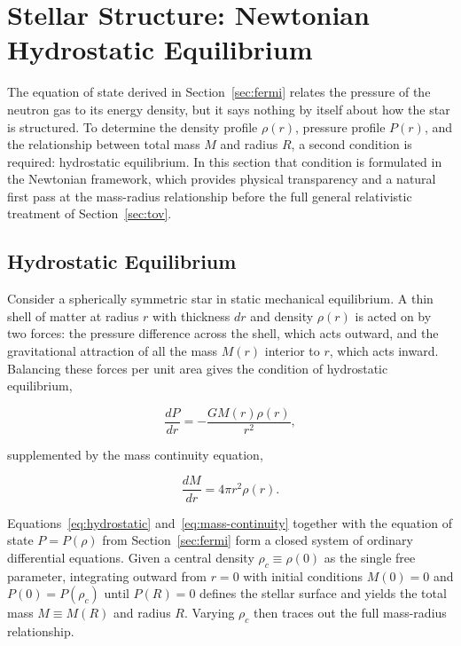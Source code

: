\section{Stellar Structure: Newtonian Hydrostatic Equilibrium}
\label{sec:newtonian}

The equation of state derived in Section~\ref{sec:fermi} relates the
pressure of the neutron gas to its energy density, but it says nothing
by itself about how the star is structured. To determine the density
profile $\rho(r)$, pressure profile $P(r)$, and the relationship between
total mass $M$ and radius $R$, a second condition is required: hydrostatic equilibrium. In this section that condition is formulated in the Newtonian framework, which provides physical transparency and a natural first pass at the mass-radius relationship before the full general relativistic treatment of Section~\ref{sec:tov}.

\subsection{Hydrostatic Equilibrium}

Consider a spherically symmetric star in static mechanical equilibrium.
A thin shell of matter at radius $r$ with thickness $dr$ and density
$\rho(r)$ is acted on by two forces: the pressure difference across the
shell, which acts outward, and the gravitational attraction of all the
mass $M(r)$ interior to $r$, which acts inward. Balancing these forces
per unit area gives the condition of hydrostatic equilibrium,

\begin{equation}
    \frac{dP}{dr} = -\frac{G M(r) \rho(r)}{r^2},
    \label{eq:hydrostatic}
\end{equation}

supplemented by the mass continuity equation,

\begin{equation}
    \frac{dM}{dr} = 4\pi r^2 \rho(r).
    \label{eq:mass-continuity}
\end{equation}

Equations~\eqref{eq:hydrostatic} and~\eqref{eq:mass-continuity} together
with the equation of state $P = P(\rho)$ from Section~\ref{sec:fermi}
form a closed system of ordinary differential equations. Given a central
density $\rho_c \equiv \rho(0)$ as the single free parameter, integrating
outward from $r = 0$ with initial conditions $M(0) = 0$ and $P(0) =
P(\rho_c)$ until $P(R) = 0$ defines the stellar surface and yields the
total mass $M \equiv M(R)$ and radius $R$. Varying $\rho_c$ then traces
out the full mass-radius relationship.

